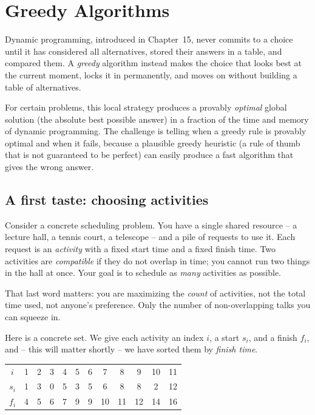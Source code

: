\chapter{Greedy Algorithms}

Dynamic programming, introduced in Chapter~15, never commits to a choice until it has considered all alternatives, stored their answers in a table, and compared them. A \emph{greedy} algorithm instead makes the choice that looks best at the current moment, locks it in permanently, and moves on without building a table of alternatives.

For certain problems, this local strategy produces a provably \emph{optimal} global solution (the absolute best possible answer) in a fraction of the time and memory of dynamic programming. The challenge is telling when a greedy rule is provably optimal and when it fails, because a plausible greedy heuristic (a rule of thumb that is not guaranteed to be perfect) can easily produce a fast algorithm that gives the wrong answer.

\chapterline

\section{A first taste: choosing activities}

Consider a concrete scheduling problem. You have a single shared resource -- a lecture hall, a tennis court, a telescope -- and a pile of requests to use it. Each request is an \emph{activity} with a fixed start time
and a fixed finish time. Two activities are \emph{compatible} if they do not
overlap in time; you cannot run two things in the hall at once. Your goal is to
schedule as \emph{many} activities as possible.

That last word matters: you are maximizing the \emph{count} of activities, not
the total time used, not anyone's preference. Only the number of non-overlapping
talks you can squeeze in.

Here is a concrete set. We give each activity an index $i$, a start $s_i$,
and a finish $f_i$, and -- this will matter shortly -- we have sorted them by
\emph{finish time}.

\begin{center}
\begin{tabular}{c|ccccccccccc}
\toprule
$i$   & 1 & 2 & 3 & 4 & 5 & 6 & 7 & 8 & 9 & 10 & 11 \\
$s_i$ & 1 & 3 & 0 & 5 & 3 & 5 & 6 & 8 & 8 & 2  & 12 \\
$f_i$ & 4 & 5 & 6 & 7 & 9 & 9 & 10 & 11 & 12 & 14 & 16 \\
\bottomrule
\end{tabular}
\end{center}

